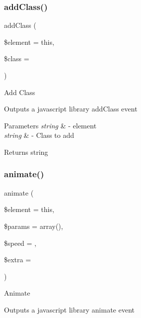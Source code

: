 \subsubsection{\texorpdfstring{add\+Class()}{addClass()}}
{\footnotesize\ttfamily add\+Class (\begin{DoxyParamCaption}\item[{}]{\$element = {\ttfamily \textquotesingle{}this\textquotesingle{}},  }\item[{}]{\$class = {\ttfamily \textquotesingle{}\textquotesingle{}} }\end{DoxyParamCaption})}

Add Class

Outputs a javascript library add\+Class event


\begin{DoxyParams}{Parameters}
{\em string} & -\/ element \\
\hline
{\em string} & -\/ Class to add \\
\hline
\end{DoxyParams}
\begin{DoxyReturn}{Returns}
string 
\end{DoxyReturn}
\mbox{\label{class_c_i___javascript_a04c5fa4911b166171608bc2651b1b2df}} 
\subsubsection{\texorpdfstring{animate()}{animate()}}
{\footnotesize\ttfamily animate (\begin{DoxyParamCaption}\item[{}]{\$element = {\ttfamily \textquotesingle{}this\textquotesingle{}},  }\item[{}]{\$params = {\ttfamily array()},  }\item[{}]{\$speed = {\ttfamily \textquotesingle{}\textquotesingle{}},  }\item[{}]{\$extra = {\ttfamily \textquotesingle{}\textquotesingle{}} }\end{DoxyParamCaption})}

Animate

Outputs a javascript library animate event


